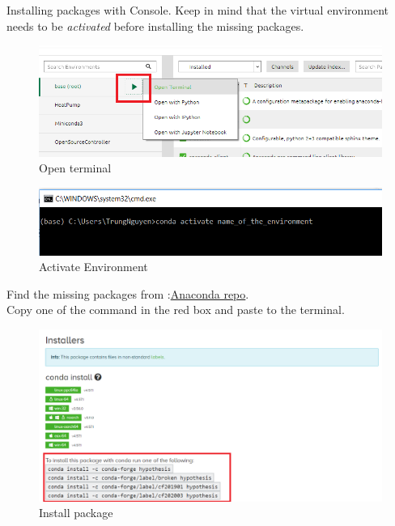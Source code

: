 \documentclass[a4paper,10pt]{article}
\begin{document}
Installing packages with Console. Keep in mind that the virtual environment needs to be \emph{activated} before installing the missing packages.

\begin{figure}[H]
\centering\includegraphics[width=1\columnwidth]{Pictures/Open_terminal.png}
\caption[Short title]{Open terminal}
\label{fig:ff4}\end{figure}

\begin{figure}[H]
\centering\includegraphics[width=1\columnwidth]{Pictures/activate_env.png}
\caption[Short title]{Activate Environment}
\label{fig:ff5}\end{figure}

Find the missing packages from :\href{https://anaconda.org/conda-forge/repo}{Anaconda repo}.\\ 
Copy one of the command in the red box and paste to the terminal.

\begin{figure}[H]
\centering\includegraphics[width=1\columnwidth]{Pictures/install_pack.png}
\caption[Short title]{Install package}
\label{fig:ff6}\end{figure}
\end{document}

